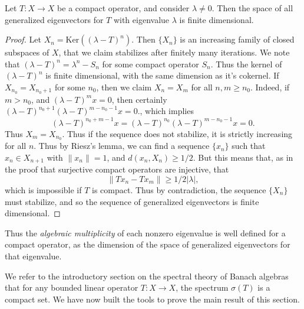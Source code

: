 \begin{theorem}
    Let $T: X \to X$ be a compact operator, and consider $\lambda \neq 0$. Then the space of all generalized eigenvectors for $T$ with eigenvalue $\lambda$ is finite dimensional.
\end{theorem}
\begin{proof}
    Let $X_n = \text{Ker}((\lambda - T)^n)$. Then $\{ X_n \}$ is an increasing family of closed subspaces of $X$, that we claim stabilizes after finitely many iterations. We note that $(\lambda - T)^n = \lambda^n - S_n$ for some compact operator $S_n$. Thus the kernel of $(\lambda - T)^n$ is finite dimensional, with the same dimension as it's cokernel. If $X_{n_0} = X_{n_0 + 1}$ for some $n_0$, then we claim $X_n = X_m$ for all $n,m \geq n_0$. Indeed, if $m > n_0$, and $(\lambda - T)^m x = 0$, then certainly $(\lambda - T)^{n_0+1} (\lambda - T)^{m - n_0 - 1} x = 0$., which implies
    \[ (\lambda - T)^{n_0+m-1} x = (\lambda - T)^{n_0} (\lambda - T)^{m - n_0 - 1} x = 0. \]
    Thus $X_m = X_{n_0}$. Thus if the sequence does not stabilize, it is strictly increasing for all $n$. Thus by Riesz's lemma, we can find a sequence $\{ x_n \}$ such that $x_n \in X_{n+1}$ with $\| x_n \| = 1$, and $d(x_n,X_n) \geq 1/2$. But this means that, as in the proof that surjective compact operators are injective, that
    \[ \| Tx_n - Tx_m \| \geq 1/2|\lambda|, \]
    which is impossible if $T$ is compact. Thus by contradiction, the sequence $\{ X_n \}$ must stabilize, and so the sequence of generalized eigenvectors is finite dimensional.
\end{proof}

Thus the \emph{algebraic multiplicity} of each nonzero eigenvalue is well defined for a compact operator, as the dimension of the space of generalized eigenvectors for that eigenvalue.

We refer to the introductory section on the spectral theory of Banach algebras that for any bounded linear operator $T: X \to X$, the spectrum $\sigma(T)$ is a compact set. We have now built the tools to prove the main result of this section.

